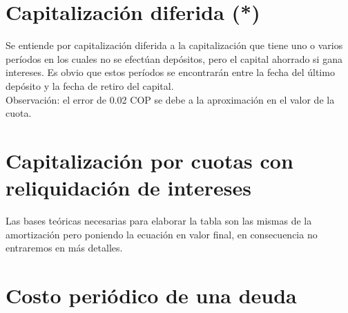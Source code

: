 	
    
	
	
	\section{Capitalización diferida (*)}
	Se entiende por capitalización diferida a la capitalización que tiene uno o varios períodos en los cuales no se efectúan depósitos, pero el capital ahorrado si gana intereses. Es obvio que estos períodos se encontrarán entre la fecha del último depósito y la fecha de retiro del capital. \\
	
	
	
	
	
	Observación: el error de  0.02 COP se debe a la aproximación en el valor de la cuota.\\
	
	\section{Capitalización por cuotas con reliquidación de intereses}
	
	Las bases teóricas necesarias para elaborar la tabla son las mismas de la amortización pero poniendo la ecuación en valor final, en consecuencia no entraremos en más detalles.\\
	
	
	
	
	
	
	
	
	\section{Costo periódico de una deuda}
	
